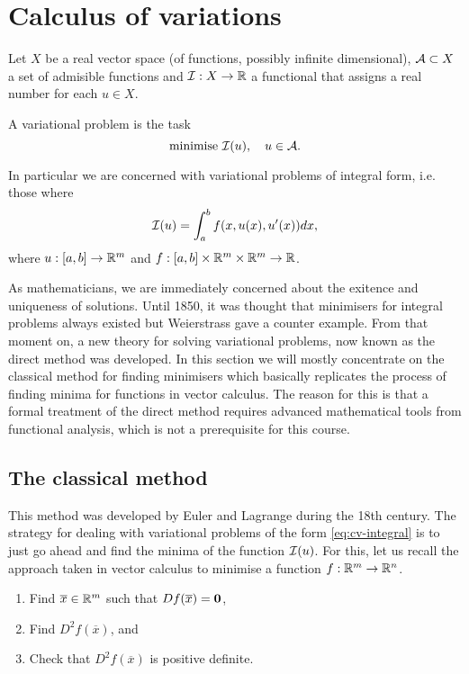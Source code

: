 \chapter{Calculus of variations}

\begin{dfn}

  Let $X$ be a real vector space (of functions, possibly infinite dimensional),
  $\mathcal{A} \subset X$ a set of admisible functions and $\mathcal{I} : X \to \mathbb{R}$ a
  functional that assigns a real number for each $u \in X$.

  A variational problem is the task
  \[
    \text{minimise } \mathcal{I}(u),\quad u \in \mathcal{A}.
  \]
\end{dfn}

In particular we are concerned with variational problems of integral form, i.e.
those where
\begin{align}
  \label{eq:cv-integral}
  \mathcal{I}(u) = \int_a^b f(x, u(x), u'(x))dx,
\end{align}
where $u : [a, b] \to \mathbb{R}^m$ and $f: [a,b] \times \mathbb{R}^m \times \mathbb{R}^m \to \mathbb{R}$.

As mathematicians, we are immediately concerned about the exitence and
uniqueness of solutions. Until 1850, it was thought that minimisers for
integral problems always existed but Weierstrass gave a counter example. From
that moment on, a new theory for solving variational problems, now known as the
direct method was developed. In this section we will mostly concentrate on the
classical method for finding minimisers which basically replicates the process
of finding minima for functions in vector calculus. The reason for this is that
a formal treatment of the direct method requires advanced mathematical tools
from functional analysis, which is not a prerequisite for this course.

\section{The classical method}

This method was developed by Euler and Lagrange during the 18th century. The
strategy for dealing with variational problems of the form
\eqref{eq:cv-integral} is to just go ahead and find the minima of the function
$\mathcal{I}(u)$. For this, let us recall the approach taken in vector calculus to minimise a function $f: \mathbb{R}^m \to \mathbb{R}^n$.
\begin{enumerate}
  \item Find $\overline{x} \in \mathbb{R}^m$ such that $Df(\overline{x}) = \mathbf{0}$,
  \item Find $D^2f(\overline{x})$, and
  \item Check that $D^2f(\overline{x})$ is positive definite.
\end{enumerate}


